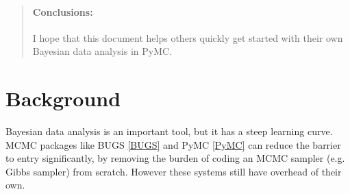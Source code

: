 \documentclass[10pt]{bmc_article}
\newenvironment{bmcformat}{\begin{raggedright}\baselineskip20pt\sloppy\setboolean{publ}{false}}{\end{raggedright}\baselineskip20pt\sloppy}
\begin{document}
\begin{bmcformat}
\begin{abstract}
        \paragraph*{Conclusions:} I hope that this document helps others quickly get started with their own Bayesian data analysis in PyMC.
\end{abstract}












\section*{Background}
Bayesian data analysis is an important tool, but it has a steep
learning curve.  MCMC packages like BUGS \ref{BUGS} and PyMC
\ref{PyMC} can reduce the barrier to entry significantly, by removing
the burden of coding an MCMC sampler (e.g. Gibbs sampler) from
scratch.  However these systems still have overhead of their own.


\end{bmcformat}
\end{document}
